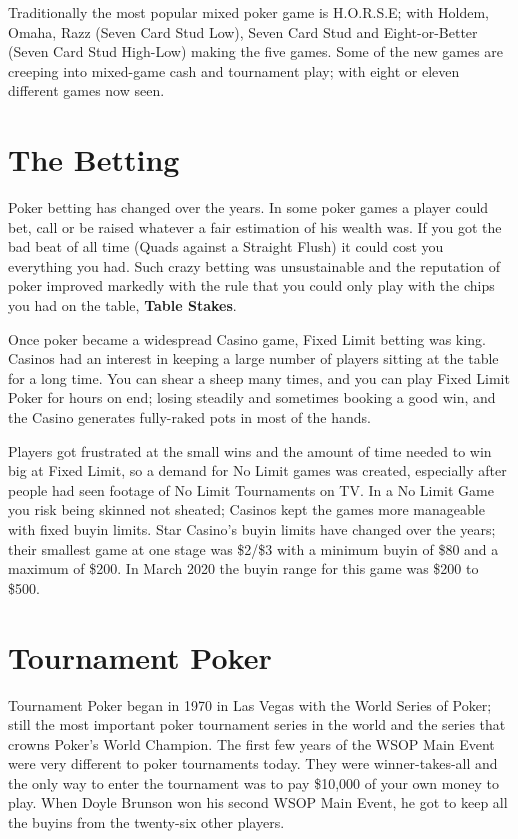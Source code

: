 Traditionally the most popular mixed poker game is H.O.R.S.E; with
Holdem, Omaha, Razz (Seven Card Stud Low), Seven Card Stud and
Eight-or-Better (Seven Card Stud High-Low) making the five games.
Some of the new games are creeping into mixed-game cash and tournament
play; with eight or eleven different games now seen.

\section{The Betting}

Poker betting has changed over the years. In some poker games
a player could bet, call or be raised whatever a fair estimation of
his wealth was. If you got the bad beat of all time (Quads against
a Straight Flush) it could cost you everything you had. Such crazy
betting was unsustainable and the reputation of poker
improved markedly with the rule that you could only play with the
chips you had on the table, \textbf{Table Stakes}.

Once poker became a widespread Casino game, Fixed Limit betting was
king. Casinos had an interest in keeping a large number of players
sitting at the table for a long time. You can shear a sheep many times,
and you can play Fixed Limit Poker for hours on end; losing steadily
and sometimes booking a good win, and the Casino generates fully-raked
pots in most of the hands.


Players got frustrated at the small wins and the amount of time needed
to win big at Fixed Limit, so a demand for No Limit games was created,
especially after people had seen footage of No Limit Tournaments on TV.
In a No Limit Game you risk being skinned not sheated; Casinos kept
the games more manageable with fixed buyin limits. Star Casino's buyin limits
have changed over the years; their smallest game at one stage was
\$2/\$3 with a minimum buyin of \$80 and a maximum of \$200. In March 2020
the buyin range for this game was \$200 to \$500.


\section{Tournament Poker}

Tournament Poker began in 1970 in Las Vegas with the World Series of
Poker; still the most important poker tournament series in the world
and the series that crowns Poker's World Champion. The first few years
of the WSOP Main Event were very different to poker tournaments today.
They were winner-takes-all and the only way to enter the
tournament was to pay \$10,000 of your own money to play.
When Doyle Brunson won his second WSOP Main Event, he got to keep
all the buyins from the twenty-six other players.

